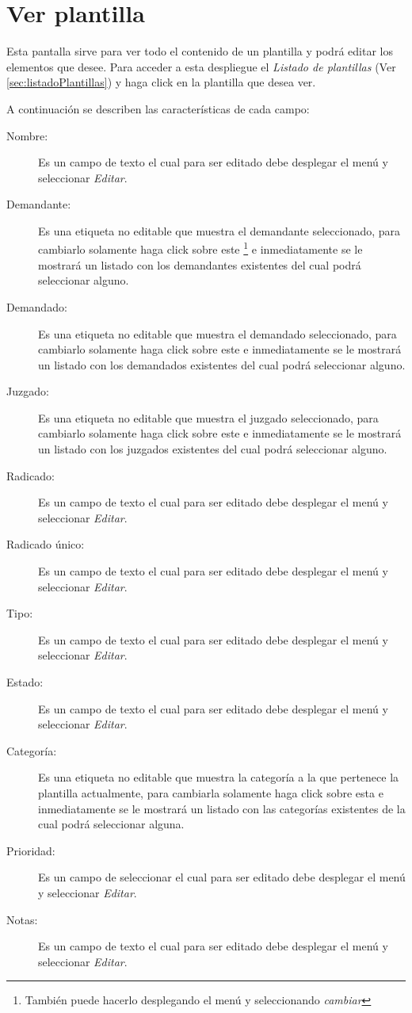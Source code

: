 \section{Ver plantilla}
\label{sec:verPlantilla}
Esta pantalla sirve para ver todo el contenido de un plantilla y podr\'a editar
los elementos que desee. Para acceder a esta despliegue el \emph{Listado de
plantillas} (Ver \ref{sec:listadoPlantillas}) y haga click en la plantilla que
desea ver.

A continuaci\'on se describen las caracter\'isticas de cada campo:

\begin{description}
\item[Nombre:]Es un campo de texto el cual para ser editado debe desplegar el
men\'u \blackberry y seleccionar \emph{Editar}.
\item[Demandante:]Es una etiqueta no editable que muestra el demandante
seleccionado, para cambiarlo solamente haga click sobre este
\footnote{Tambi\'en puede hacerlo desplegando el men\'u \blackberry y
seleccionando \emph{cambiar}}
e inmediatamente se
le mostrar\'a un listado con los demandantes existentes del cual podr\'a
seleccionar alguno.
\item[Demandado:]Es una etiqueta no editable que muestra el demandado
seleccionado, para cambiarlo solamente haga click sobre este
\footnotemark[\value{footnote}]
e inmediatamente
se le mostrar\'a un listado con los demandados existentes del cual podr\'a
seleccionar alguno.
\item[Juzgado:]Es una etiqueta no editable que muestra el juzgado
seleccionado, para cambiarlo solamente haga click sobre este
\footnotemark[\value{footnote}]
e inmediatamente
se le mostrar\'a un listado con los juzgados existentes del cual podr\'a
seleccionar alguno.
\item[Radicado:]Es un campo de texto el cual para ser editado debe desplegar el
men\'u \blackberry y seleccionar \emph{Editar}.
\item[Radicado \'unico:]Es un campo de texto el cual para ser editado debe
desplegar el men\'u \blackberry y seleccionar \emph{Editar}.
\item[Tipo:]Es un campo de texto el cual para ser editado debe desplegar el
men\'u \blackberry y seleccionar \emph{Editar}.
\item[Estado:]Es un campo de texto el cual para ser editado debe desplegar el
men\'u \blackberry y seleccionar \emph{Editar}.
\item[Categor\'ia:]Es una etiqueta no editable que muestra la categor\'ia
a la que pertenece la plantilla actualmente, para cambiarla solamente haga click
sobre esta
\footnotemark[\value{footnote}]
e inmediatamente se le mostrar\'a un listado con las categor\'ias existentes de
la cual podr\'a seleccionar alguna.
\item[Prioridad:]Es un campo de seleccionar el cual para ser editado debe desplegar
el men\'u \blackberry y seleccionar \emph{Editar}.
\item[Notas:]Es un campo de texto el cual para ser editado debe desplegar el
men\'u \blackberry y seleccionar \emph{Editar}.
\end{description}

